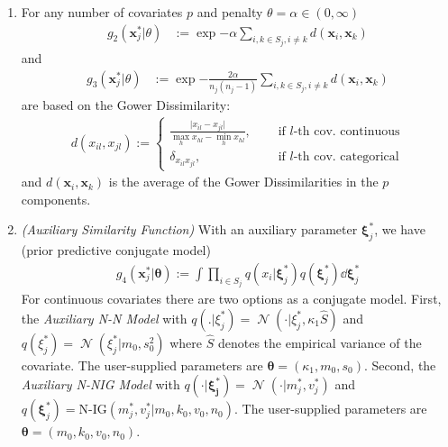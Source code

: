 \documentclass[12pt,a4paper]{article}
\DeclareMathOperator{\Normal}{\mathcal{N}}
\begin{document}
\begin{enumerate}
    \item For any number of covariates $p$ and penalty $\theta = \alpha \in (0, \infty)$
    \begin{align*}
        g_2( \pmb{x}_j^* \vert \theta) &:= \exp{- \alpha \sum_{i,k \in S_j, i \neq k} d(\pmb{x}_i, \pmb{x}_k ) }
    \end{align*}
    and
    \begin{align*}
        g_3( \pmb{x}_j^* \vert \theta) &:= \exp{- \frac{2 \alpha}{n_j (n_j - 1)} \sum_{i,k \in S_j, i \neq k} d(\pmb{x}_i, \pmb{x}_k ) }
    \end{align*}
    are based on the Gower Dissimilarity:
    \begin{align*}
        d(x_{il}, x_{jl}) := \begin{cases}
            \frac{\vert x_{il} - x_{jl} \vert}{\max_h x_{hl} - \min_h x_{hl}}, &\quad \text{ if } l \text{-th cov. continuous}\\
            \delta_{x_{il} x_{jl}}, &\quad \text{ if } l \text{-th cov. categorical}
        \end{cases}
    \end{align*}
    and $d(\pmb{x}_i, \pmb{x}_k )$ is the average of the Gower Dissimilarities in the $p$ components.
    \item  \textit{(Auxiliary Similarity Function)} With an auxiliary parameter
    $\pmb{\xi}_j^*$, we have (prior predictive conjugate model)
    \begin{align*}
        g_4(\pmb{x}_j^* \vert \pmb{\theta}) := \int \prod_{i \in S_j} q(x_i \vert \pmb{\xi}^*_j) q(\pmb{\xi}^*_j) \dd \pmb{\xi}^*_j
    \end{align*}
    For continuous covariates there are two options as a conjugate model. First, the \textit{Auxiliary N-N Model} with $q(. \vert \xi_j^*) = \Normal (\cdot \vert \xi_j^*, \kappa_1 \hat{S})$  and $q(\xi_j^*) = \Normal (\xi_j^* \vert m_0, s_0^2)$ where $\hat{S}$ denotes the empirical variance of the covariate. 
    The user-supplied parameters are $\pmb{\theta} = ( \kappa_1, m_0, s_0).$ Second, the \textit{Auxiliary N-NIG Model} with $q (\cdot \vert \pmb{\xi_j^*}) = \Normal(\cdot \vert m_j^*, v_j^*)$ and $q(\pmb{\xi}_j^*) = \text{N-IG} (m_j^*, v_j^* \vert m_0, k_0, v_0, n_0)$. The user-supplied parameters are $\pmb{\theta} = (m_0, k_0,v_0, n_0)$. 
    

\end{enumerate}
\end{document}
